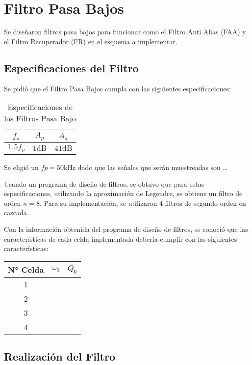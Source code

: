 \chapter{Filtro Pasa Bajos}
Se diseñaron filtros pasa bajos para funcionar como el Filtro Anti Alias (FAA) y el Filtro Recuperador (FR) en el esquema a implementar.
\section{Especificaciones del Filtro}
Se pidió que el Filtro Pasa Bajos cumpla con las siguientes especificaciones:

\begin{table}[ht]
    \centering
    \begin{tabular}{|c|c|c|}
        \hline
        $f_a$  &   $A_p$   &   $A_a$    \\
        \hline
        $1.5 f_p$   &   $1 \si{\deci\bel}$ &   $41 \si{\deci\bel}$    \\
        \hline
    \end{tabular}
    \caption{Especificaciones de los Filtros Pasa Bajo}
\end{table}

Se eligió un $fp = 50 \si{\kilo\hertz}$ dado que las señales que serán muestreadas son \dots

Usando un programa de diseño de filtros, se obtuvo que para estas especificaciones, utilizando la aproximación de Legendre, se obtiene un filtro de orden $n=8$. Para su implementación, se utilizaron $4$ filtros de segundo orden en cascada.

Con la información obtenida del programa de diseño de filtros, se conoció que las características de cada celda implementada debería cumplir con las siguientes características:

\begin{table}[ht]
    \centering
    \begin{tabular}{|c|c|c|}
        \hline
        N° Celda    &   $\omega_0$  &   $Q_0$   \\
        \hline
        1   &   &   \\
        2   &   &   \\
        3   &   &   \\
        4   &   &   \\
        \hline
    \end{tabular}
\end{table}

\section{Realización del Filtro}

